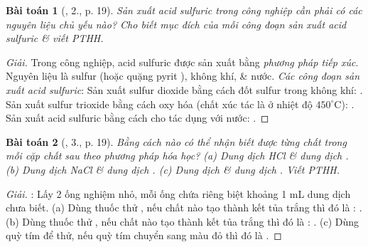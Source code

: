 \documentclass{article}
\newtheorem{baitoan}{Bài toán}
\begin{document}
\begin{baitoan}[\cite{SGK_Hoa_Hoc_9}, 2., p. 19]
	Sản xuất acid sulfuric trong công nghiệp cần phải có các nguyên liệu chủ yếu nào? Cho biết mục đích của mỗi công đoạn sản xuất acid sulfuric \& viết {\rm PTHH}.
\end{baitoan}

\begin{proof}[Giải]
	Trong công nghiệp, acid sulfuric được sản xuất bằng \textit{phương pháp tiếp xúc}. Nguyên liệu là sulfur (hoặc quặng pyrit ), không khí, \& nước. \textit{Các công đoạn sản xuất acid sulfuric}: Sản xuất sulfur dioxide bằng cách đốt sulfur trong không khí: . Sản xuất sulfur trioxide  bằng cách oxy hóa  (chất xúc tác là  ở nhiệt độ $450^\circ$C): . Sản xuất acid sulfuric bằng cách cho  tác dụng với nước: .
\end{proof}

\begin{baitoan}[\cite{SGK_Hoa_Hoc_9}, 3., p. 19]
	Bằng cách nào có thể nhận biết được từng chất trong mỗi cặp chất sau theo phương pháp hóa học? (a) Dung dịch {\rm HCl} \& dung dịch {\rm{}}. (b) Dung dịch {\rm NaCl} \& dung dịch {\rm{}}. (c) Dung dịch {\rm{}} \& dung dịch {\rm{}}. Viết {\rm PTHH}.
\end{baitoan}

\begin{proof}[Giải]
	\cite[p. 14]{Ninh_giai_BT_Hoa_Hoc_9}: Lấy 2 ống nghiệm nhỏ, mỗi ống chứa riêng biệt khoảng 1 mL dung dịch chưa biết. (a) Dùng thuốc thử , nếu chất nào tạo thành kết tủa trắng thì đó là : . (b) Dùng thuốc thử , nếu chất nào tạo thành kết tủa trắng thì đó là : . (c) Dùng quỳ tím để thử, nếu quỳ tím chuyển sang màu đỏ thì đó là .
\end{proof}
\end{document}
